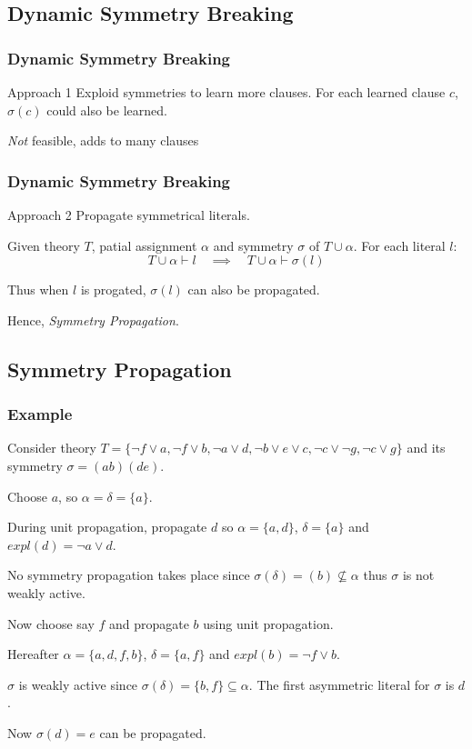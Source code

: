\documentclass{beamer}
\begin{document}
	\subsection{Dynamic Symmetry Breaking}
	\begin{frame}
		\frametitle{Dynamic Symmetry Breaking}

		\begin{block}{Approach 1}
			Exploid symmetries to learn more clauses.
			For each learned clause $c$, $\sigma(c)$ could also be learned.
			
			\pause

			\emph{Not} feasible, adds to many clauses
		\end{block}
	\end{frame}

	\begin{frame}
		\frametitle{Dynamic Symmetry Breaking}
		
		\begin{block}{Approach 2}
			Propagate symmetrical literals.

			Given theory $T$, patial assignment $\alpha$ and symmetry $\sigma$ of $T \cup \alpha$. For each literal $l$:
			\begin{equation}
				T \cup \alpha \vdash l \quad
				\implies
				\quad T \cup \alpha \vdash \sigma(l)
			\end{equation}

			Thus when $l$ is progated, $\sigma(l)$ can also be propagated.
			
			\pause
			
			Hence, \emph{Symmetry Propagation}.
		\end{block}
	\end{frame}

	\subsection{Symmetry Propagation}
	\begin{frame}
		\frametitle{Example}
	
		\begin{block}{}
			Consider theory $T = \{\neg f \vee a, \neg f \vee b, \neg a \vee d, \neg b \vee e \vee c, \neg c \vee \neg g, \neg c \vee g\}$ and its symmetry $\sigma = (ab)(de)$.
			
			Choose $a$, so $\alpha = \delta = \{a\}$.
			
			During unit propagation, propagate $d$ so $\alpha = \{a,d\}$, $\delta = \{a\}$ and $expl(d) = \neg a \vee d$.
			
			No symmetry propagation takes place since $\sigma(\delta)=(b) \not \subseteq \alpha$ thus $\sigma$ is not weakly active.
			
			Now choose say $f$ and propagate $b$ using unit propagation.
			
			Hereafter $\alpha=\{a,d,f,b\}$, $\delta=\{a,f\}$ and $expl(b) = \neg f \vee b$.
			
			$\sigma$ is weakly active since $\sigma(\delta) = \{b,f\} \subseteq \alpha$. The first asymmetric literal for $\sigma$ is $d$.
			
			Now $\sigma(d) = e$ can be propagated.
		\end{block}
	\end{frame}
\end{document}
